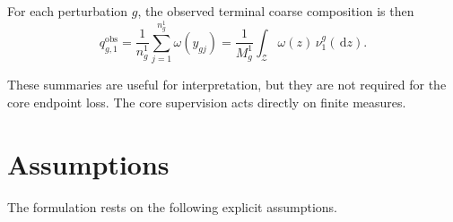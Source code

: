 \documentclass[11pt]{article}
\newcommand{\dd}{\,\mathrm{d}}
\newcommand{\Zcal}{\mathcal{Z}}
\begin{document}
For each perturbation $g$, the observed terminal coarse composition is then
\begin{equation}
q_{g,1}^{\mathrm{obs}}
=
\frac{1}{n_g^1}\sum_{j=1}^{n_g^1}\omega(y_{gj})
=
\frac{1}{M_g^1}\int_{\Zcal}\omega(z)\,\nu_1^g(\dd z).
\label{eq:observed_composition}
\end{equation}

These summaries are useful for interpretation, but they are not required for the core endpoint loss. The core supervision acts directly on finite measures.

\section{Assumptions}

The formulation rests on the following explicit assumptions.
\end{document}
